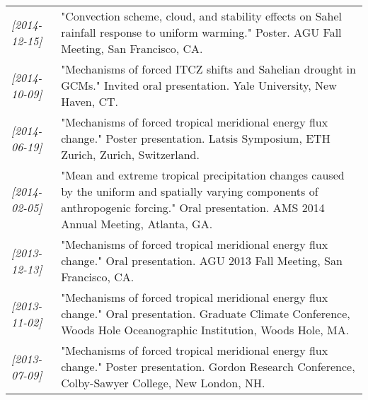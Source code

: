 \documentclass[12pt,letterpaper]{article}
\begin{document}
\begin{center}
\begin{tabularx}{\textwidth}{lX}
\textit{[2014-12-15]} & "Convection scheme, cloud, and stability effects on Sahel rainfall response to uniform warming."  Poster.  AGU Fall Meeting, San Francisco, CA.\\
\textit{[2014-10-09]} & "Mechanisms of forced ITCZ shifts and Sahelian drought in GCMs."  Invited oral presentation.  Yale University, New Haven, CT.\\
\textit{[2014-06-19]} & "Mechanisms of forced tropical meridional energy flux change."  Poster presentation.  Latsis Symposium, ETH Zurich, Zurich, Switzerland.\\
\textit{[2014-02-05]} & "Mean and extreme tropical precipitation changes caused by the uniform and spatially varying components of anthropogenic forcing."  Oral presentation.  AMS 2014 Annual Meeting, Atlanta, GA.\\
\textit{[2013-12-13]} & "Mechanisms of forced tropical meridional energy flux change."  Oral presentation.  AGU 2013 Fall Meeting, San Francisco, CA.\\
\textit{[2013-11-02]} & "Mechanisms of forced tropical meridional energy flux change."  Oral presentation.  Graduate Climate Conference, Woods Hole Oceanographic Institution, Woods Hole, MA.\\
\textit{[2013-07-09]} & "Mechanisms of forced tropical meridional energy flux change."  Poster presentation.  Gordon Research Conference, Colby-Sawyer College, New London, NH.\\
\end{tabularx}
\end{center}
\end{document}
